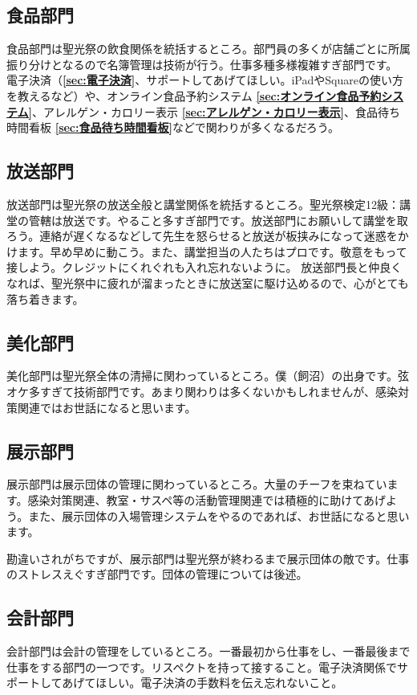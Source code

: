 \documentclass[dvipdfmx,jb5]{jarticle}
\begin{document}
\subsection{食品部門}
食品部門は聖光祭の飲食関係を統括するところ。部門員の多くが店舗ごとに所属振り分けとなるので名簿管理は技術が行う。仕事多種多様複雑すぎ部門です。
電子決済（{\bf \ref{sec:電子決済}}、サポートしてあげてほしい。iPadやSquareの使い方を教えるなど）や、オンライン食品予約システム {\bf \ref{sec:オンライン食品予約システム}}、アレルゲン・カロリー表示 {\bf \ref{sec:アレルゲン・カロリー表示}}、食品待ち時間看板 {\bf \ref{sec:食品待ち時間看板}}などで関わりが多くなるだろう。

\subsection{放送部門}
放送部門は聖光祭の放送全般と講堂関係を統括するところ。聖光祭検定12級：講堂の管轄は放送です。やること多すぎ部門です。放送部門にお願いして講堂を取ろう。連絡が遅くなるなどして先生を怒らせると放送が板挟みになって迷惑をかけます。早め早めに動こう。また、講堂担当の人たちはプロです。敬意をもって接しよう。クレジットにくれぐれも入れ忘れないように。
放送部門長と仲良くなれば、聖光祭中に疲れが溜まったときに放送室に駆け込めるので、心がとても落ち着きます。

\subsection{美化部門}
美化部門は聖光祭全体の清掃に関わっているところ。僕（飼沼）の出身です。弦オケ多すぎて技術部門です。あまり関わりは多くないかもしれませんが、感染対策関連ではお世話になると思います。

\subsection{展示部門}
展示部門は展示団体の管理に関わっているところ。大量のチーフを束ねています。感染対策関連、教室・サスペ等の活動管理関連では積極的に助けてあげよう。また、展示団体の入場管理システムをやるのであれば、お世話になると思います。

勘違いされがちですが、展示部門は聖光祭が終わるまで展示団体の敵です。仕事のストレスえぐすぎ部門です。団体の管理については後述。

\subsection{会計部門}
会計部門は会計の管理をしているところ。一番最初から仕事をし、一番最後まで仕事をする部門の一つです。リスペクトを持って接すること。電子決済関係でサポートしてあげてほしい。電子決済の手数料を伝え忘れないこと。
\end{document}
